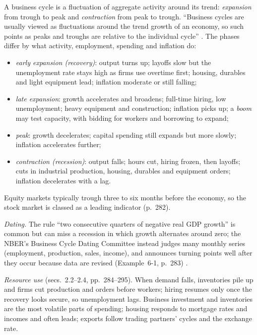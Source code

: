 \begin{qfdefinition}\label{def:business-credit-cycles}
 A business cycle is a fluctuation of aggregate activity around its trend: \emph{expansion} from trough to peak and \emph{contraction} from peak to trough. ``Business cycles are usually viewed as fluctuations around the trend growth of an economy, so such points as peaks and troughs are relative to the individual cycle'' \citep[chap.~6, sec.~2.1, pp.~280--284, Exhibits~6-1a and~6-1b]{economics-investment-decision-makers-2013}. The phases differ by what activity, employment, spending and inflation do:
\begin{itemize}
\item \emph{early expansion (recovery)}: output turns up; layoffs slow but the unemployment rate stays high as firms use overtime first; housing, durables and light equipment lead; inflation moderate or still falling;
\item \emph{late expansion}: growth accelerates and broadens; full-time hiring, low unemployment; heavy equipment and construction; inflation picks up; a \emph{boom} may test capacity, with bidding for workers and borrowing to expand;
\item \emph{peak}: growth decelerates; capital spending still expands but more slowly; inflation accelerates further;
\item \emph{contraction (recession)}: output falls; hours cut, hiring frozen, then layoffs; cuts in industrial production, housing, durables and equipment orders; inflation decelerates with a lag.
\end{itemize}
Equity markets typically trough three to six months before the economy, so the stock market is classed as a leading indicator (p.~282).

\emph{Dating.} The rule ``two consecutive quarters of negative real GDP growth'' is common but can miss a recession in which growth alternates around zero; the NBER's Business Cycle Dating Committee instead judges many monthly series (employment, production, sales, income), and announces turning points well after they occur because data are revised (Example~6-1, p.~283) \citep[dating page]{nber-business-cycles}.

\emph{Resource use} (secs.~2.2--2.4, pp.~284--295). When demand falls, inventories pile up and firms cut production and orders before workers; hiring resumes only once the recovery looks secure, so unemployment lags. Business investment and inventories are the most volatile parts of spending; housing responds to mortgage rates and incomes and often leads; exports follow trading partners' cycles and the exchange rate.


\end{qfdefinition}
